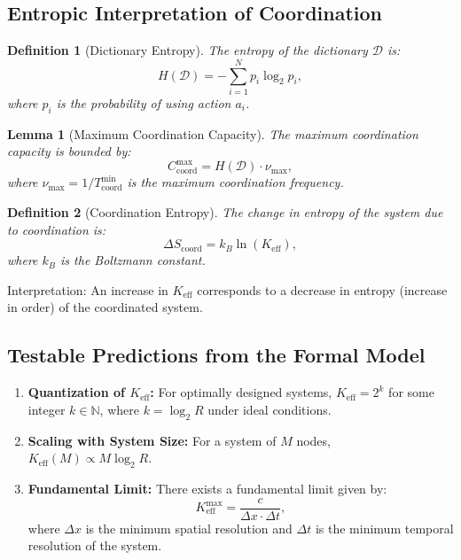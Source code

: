 \documentclass[12pt]{article}
\newtheorem{definition}{Definition}
\newtheorem{lemma}{Lemma}
\begin{document}
	\subsection{Entropic Interpretation of Coordination}
	\label{app:entropy}
	
	\begin{definition}[Dictionary Entropy]
		The entropy of the dictionary $\mathcal{D}$ is:
		\[
		H(\mathcal{D}) = - \sum_{i=1}^{N} p_i \log_2 p_i,
		\]
		where $p_i$ is the probability of using action $a_i$.
	\end{definition}
	
	\begin{lemma}[Maximum Coordination Capacity]
		The maximum coordination capacity is bounded by:
		\[
		C_{\text{coord}}^{\text{max}} = H(\mathcal{D}) \cdot \nu_{\text{max}},
		\]
		where $\nu_{\text{max}} = 1 / T_{\text{coord}}^{\text{min}}$ is the maximum coordination frequency.
	\end{lemma}
	
	\begin{definition}[Coordination Entropy]
		The change in entropy of the system due to coordination is:
		\[
		\Delta S_{\text{coord}} = k_B \ln(K_{\mathrm{eff}}),
		\]
		where $k_B$ is the Boltzmann constant.
	\end{definition}
	
	Interpretation: An increase in $K_{\mathrm{eff}}$ corresponds to a decrease in entropy (increase in order) of the coordinated system.
	
	\subsection{Testable Predictions from the Formal Model}
	\label{app:predictions}
	
	\begin{enumerate}
		\item \textbf{Quantization of $K_{\mathrm{eff}}$:} For optimally designed systems, $K_{\mathrm{eff}} = 2^k$ for some integer $k \in \mathbb{N}$, where $k = \log_2 R$ under ideal conditions.
		
		\item \textbf{Scaling with System Size:} For a system of $M$ nodes, $K_{\mathrm{eff}}(M) \propto M \log_2 R$.
		
		\item \textbf{Fundamental Limit:} There exists a fundamental limit given by:
		\[
		K_{\mathrm{eff}}^{\text{max}} = \frac{c}{\Delta x \cdot \Delta t},
		\]
		where $\Delta x$ is the minimum spatial resolution and $\Delta t$ is the minimum temporal resolution of the system.
	\end{enumerate}
	
\end{document}
